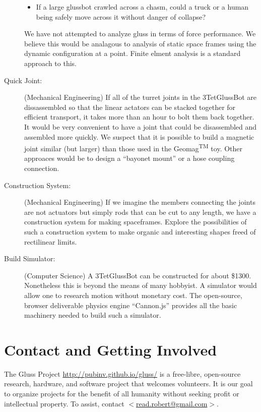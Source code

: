 \documentclass[11pt]{article}
\begin{document}
\begin{description}
\begin{itemize}
\item If a large glussbot crawled across a chasm, could a truck or a human being safely move
  across it without danger of collapse?
\end{itemize}
We have not attempted to analyze gluss in terms of force performance. We believe this would
be analagous to analysis of static space frames using the dynamic configuration at a point.
Finite elment analysis is a standard approach to this.
\item [Quick Joint:] (Mechanical Engineering) If all of the turret joints in the 3TetGlussBot are dissassembled so that
  the linear actators can be stacked together for efficient transport, it takes more than an hour
  to bolt them back together. It would be very convenient to have a joint that could be
  disassembled and assembled more quickly. We suspect that it is possible to build a magnetic
  joint similar (but larger) than those used in the Geomag\textsuperscript{TM} toy.
  Other approaces would be to design a ``bayonet mount'' or a hose coupling connection.
\item [Construction System:] (Mechanical Engineering) If we imagine the members connecting the joints are not actuators but
  simply rods that can be cut to any length, we have a construction system for making spaceframes.
  Explore the possibilities of such a construction system to make organic and interesting shapes
  freed of rectilinear limits.
\item [Build Simulator:] (Computer Science) A 3TetGlussBot can be constructed for about \$1300. Nonetheless this
  is beyond the means of many hobbyist. A simulator would allow one to research 
  motion without monetary cost. The open-source, browser deliverable physics engine ``Cannon.js''
  provides all the basic machinery needed to build such a simulator.
\end{description}


\section{Contact and Getting Involved}

The Gluss Project \href{http://pubinv.github.io/gluss/}{http://pubinv.github.io/gluss/}
is a free-libre, open-source research, hardware, and software project that welcomes volunteers.
It is our goal to organize projects for the benefit of all humanity without seeking profit or intellectual property.
To assist, contact \href{mailto:read.robert@gmail.com}{$<$read.robert@gmail.com$>$}.
\end{document}
